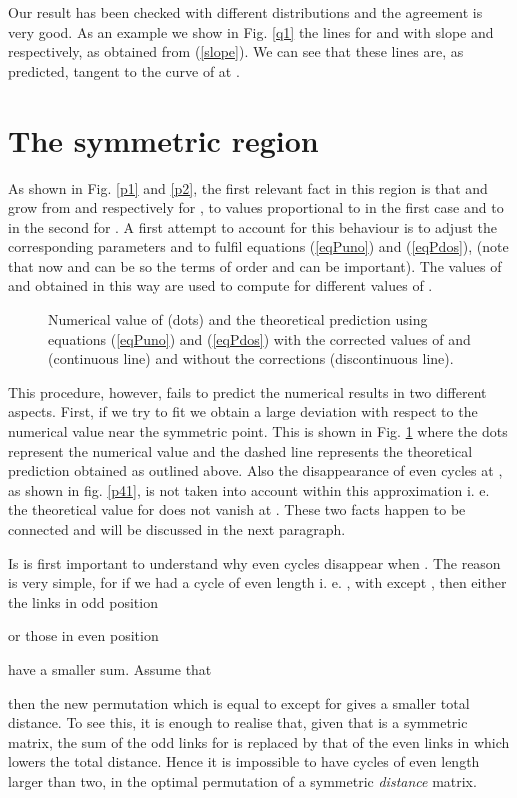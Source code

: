\documentclass[]{iopart}
\begin{document}
Our result has been checked with different distributions and
the agreement is very good. As an example we show in Fig. \ref{q1} 
the lines for  and  with slope
 and  respectively, as obtained from (\ref{slope}). 
We can see that these lines are, as predicted,
tangent to the curve of  at .

\section{The symmetric region }
As shown in Fig. \ref{p1} and \ref{p2}, the first relevant 
fact in this region
is that  and  grow from  and  respectively 
for , to values proportional to  
in the first case and to  in the second for .
A first attempt to account for this behaviour
is to adjust the corresponding parameters
 and  to fulfil equations (\ref{eqPuno}) and 
(\ref{eqPdos}), (note that now  and  can be  so the terms
of order  and  can be important).
 The values of  and  obtained
in this way are used to compute  for 
different values of . 

\begin{figure}[h!]
\caption{\small Numerical value of  (dots) and the theoretical prediction using
 equations (\ref{eqPuno}) and 
(\ref{eqPdos}) with the corrected values of  and  (continuous line) and without the
 corrections (discontinuous line).}
\label{p3teo}
\end{figure}


This procedure, however, fails to predict the numerical
results in two different aspects.
First, if we try to fit  we obtain a large deviation
with respect to the numerical value near the symmetric point.
This is shown in Fig. \ref{p3teo} where the dots represent the 
numerical value and the dashed line represents 
the theoretical prediction obtained as outlined above. 
Also the disappearance of even cycles at ,
as shown in fig. \ref{p41},
is not taken into account within this approximation
i. e. the theoretical value for  does not vanish at .
These two facts happen to be connected and will be 
discussed in the next paragraph.

Is is first important to understand why even cycles
disappear when . 
The reason is very simple, for if we had a
cycle of even length i. e.  ,
with  except , 
then either the links in odd position
 
or those in even position 
 
have a smaller sum. 
Assume that

then the new permutation  which is equal to  except
for  gives a smaller
total distance. To see this, it is enough to realise that, 
given that  is a symmetric matrix, the sum of the odd links 
for  is replaced by that of the even links in 
which lowers the total distance. Hence it is impossible
to have cycles of even length larger than two, in the optimal permutation
of a symmetric {\it distance} matrix.
\end{document}
